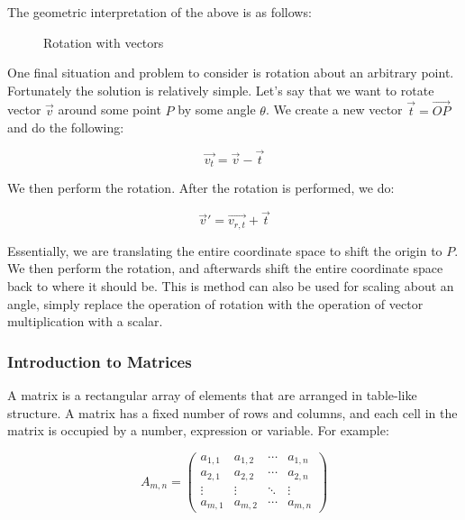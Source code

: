 \documentclass[a4paper,oneside]{report}
\begin{document}
The geometric interpretation of the above is as follows:

\begin{figure}[h]
	\centering

	Rotation with vectors
\end{figure}

One final situation and problem to consider is rotation about an arbitrary
point. Fortunately the solution is relatively simple. Let's say that we
want to rotate vector \( \overrightarrow{v} \) around some point \( P \) by
some angle \( \theta \). We create a new vector \( \overrightarrow{t} =
\overrightarrow{OP} \) and do the following:

\[ \overrightarrow{v_t} = \overrightarrow{v} - \overrightarrow{t} \]

We then perform the rotation. After the rotation is performed, we do:

\[ \overrightarrow{v}' = \overrightarrow{v_{r,t}} + \overrightarrow{t} \]

Essentially, we are translating the entire coordinate space to shift the
origin to \( P \). We then perform the rotation, and afterwards shift the
entire coordinate space back to where it should be. This is method can
also be used for scaling about an angle, simply replace the operation of
rotation with the operation of vector multiplication with a scalar.

\subsubsection{Introduction to Matrices}

A matrix is a rectangular array of elements that are arranged in table-like
structure. A matrix has a fixed number of rows and columns, and each cell
in the matrix is occupied by a number, expression or variable. For example:

\[ A_{m,n} = \begin{pmatrix}
	a_{1,1} & a_{1,2} & \cdots & a_{1,n} \\
	a_{2,1} & a_{2,2} & \cdots & a_{2,n} \\
	\vdots  & \vdots  & \ddots & \vdots  \\
	a_{m,1} & a_{m,2} & \cdots & a_{m,n}
\end{pmatrix} \]
\end{document}
